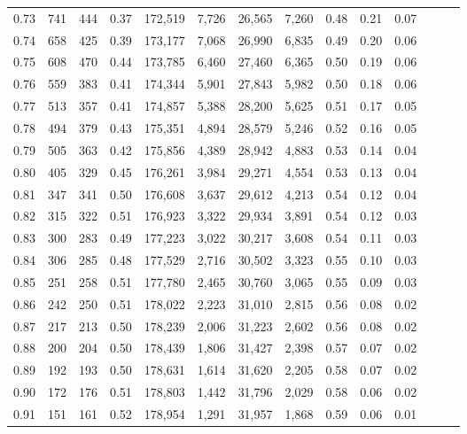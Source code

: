 \begin{tabular}{rrrrrrrrrrrrrr}
0.73 &    741 &  444 &  0.37 &  172,519 &    7,726 &  26,565 &   7,260 &  0.48 &  0.21 &      0.07 \\
0.74 &    658 &  425 &  0.39 &  173,177 &    7,068 &  26,990 &   6,835 &  0.49 &  0.20 &      0.06 \\
0.75 &    608 &  470 &  0.44 &  173,785 &    6,460 &  27,460 &   6,365 &  0.50 &  0.19 &      0.06 \\
0.76 &    559 &  383 &  0.41 &  174,344 &    5,901 &  27,843 &   5,982 &  0.50 &  0.18 &      0.06 \\
0.77 &    513 &  357 &  0.41 &  174,857 &    5,388 &  28,200 &   5,625 &  0.51 &  0.17 &      0.05 \\
0.78 &    494 &  379 &  0.43 &  175,351 &    4,894 &  28,579 &   5,246 &  0.52 &  0.16 &      0.05 \\
0.79 &    505 &  363 &  0.42 &  175,856 &    4,389 &  28,942 &   4,883 &  0.53 &  0.14 &      0.04 \\
0.80 &    405 &  329 &  0.45 &  176,261 &    3,984 &  29,271 &   4,554 &  0.53 &  0.13 &      0.04 \\
0.81 &    347 &  341 &  0.50 &  176,608 &    3,637 &  29,612 &   4,213 &  0.54 &  0.12 &      0.04 \\
0.82 &    315 &  322 &  0.51 &  176,923 &    3,322 &  29,934 &   3,891 &  0.54 &  0.12 &      0.03 \\
0.83 &    300 &  283 &  0.49 &  177,223 &    3,022 &  30,217 &   3,608 &  0.54 &  0.11 &      0.03 \\
0.84 &    306 &  285 &  0.48 &  177,529 &    2,716 &  30,502 &   3,323 &  0.55 &  0.10 &      0.03 \\
0.85 &    251 &  258 &  0.51 &  177,780 &    2,465 &  30,760 &   3,065 &  0.55 &  0.09 &      0.03 \\
0.86 &    242 &  250 &  0.51 &  178,022 &    2,223 &  31,010 &   2,815 &  0.56 &  0.08 &      0.02 \\
0.87 &    217 &  213 &  0.50 &  178,239 &    2,006 &  31,223 &   2,602 &  0.56 &  0.08 &      0.02 \\
0.88 &    200 &  204 &  0.50 &  178,439 &    1,806 &  31,427 &   2,398 &  0.57 &  0.07 &      0.02 \\
0.89 &    192 &  193 &  0.50 &  178,631 &    1,614 &  31,620 &   2,205 &  0.58 &  0.07 &      0.02 \\
0.90 &    172 &  176 &  0.51 &  178,803 &    1,442 &  31,796 &   2,029 &  0.58 &  0.06 &      0.02 \\
0.91 &    151 &  161 &  0.52 &  178,954 &    1,291 &  31,957 &   1,868 &  0.59 &  0.06 &      0.01 \\

\end{tabular}
